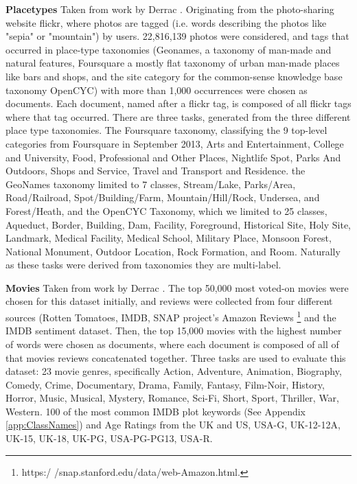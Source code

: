 \textbf{Placetypes} Taken from work by Derrac \cite{Derrac2015}. Originating from the photo-sharing website flickr, where photos are tagged (i.e. words describing the photos like "sepia" or "mountain") by users. 22,816,139 photos were considered, and tags that occurred in place-type taxonomies (Geonames, a taxonomy of man-made and natural features, Foursquare a mostly flat taxonomy of urban man-made places like bars and shops, and the site category for the common-sense knowledge base taxonomy OpenCYC) with more than 1,000 occurrences were chosen as documents. Each document, named after a flickr tag, is composed of all flickr tags where that tag occurred. There are three tasks, generated from the three different place type taxonomies. The Foursquare taxonomy, classifying the 9 top-level categories from Foursquare in September 2013, Arts and Entertainment, College and University, Food, Professional and Other Places, Nightlife Spot, Parks And Outdoors, Shops and Service, Travel and Transport and Residence. the GeoNames taxonomy limited to 7 classes, Stream/Lake, Parks/Area, Road/Railroad, Spot/Building/Farm, Mountain/Hill/Rock, Undersea, and Forest/Heath, and the OpenCYC Taxonomy, which we limited to 25 classes, Aqueduct, Border, Building, Dam, Facility, Foreground, Historical Site, Holy Site, Landmark, Medical Facility, Medical School, Military Place, Monsoon Forest, National Monument, Outdoor Location, Rock Formation, and Room. Naturally as these tasks were derived from taxonomies they are multi-label.\label{datasets:placetypes}

\textbf{Movies} Taken from work by Derrac \cite{Derrac2015}. The top 50,000 most voted-on movies were chosen for this dataset initially, and reviews were collected from four different sources (Rotten Tomatoes, IMDB, SNAP project's Amazon Reviews \footnote{https:/ /snap.stanford.edu/data/web-Amazon.html.} and the IMDB sentiment dataset. Then, the top 15,000 movies with the highest number of words were chosen as documents, where each document is composed of all of that movies reviews concatenated together. Three tasks are used to evaluate this dataset: 23 movie genres, specifically Action, Adventure, Animation, Biography, Comedy, Crime, Documentary, Drama, Family, Fantasy, Film-Noir, History, Horror, Music, Musical, Mystery, Romance, Sci-Fi, Short, Sport, Thriller, War, Western. 100 of the most common IMDB plot keywords (See Appendix \ref{app:ClassNames}) and Age Ratings from the UK and US, USA-G, UK-12-12A, UK-15, UK-18, UK-PG, USA-PG-PG13, USA-R.\label{datasets:movies} 


